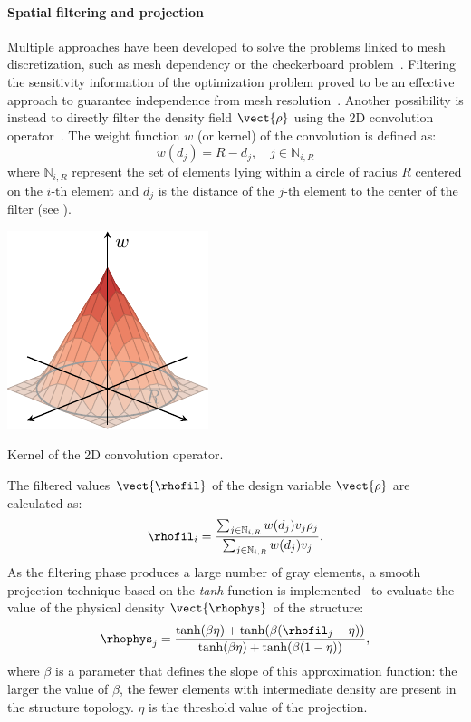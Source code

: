 \paragraph{Spatial filtering and projection} 
Multiple approaches have been developed to solve the problems linked to mesh discretization, such as mesh dependency or the checkerboard problem~. Filtering the sensitivity information of the optimization problem proved to be an effective approach to guarantee independence from mesh resolution~. Another possibility is instead to directly filter the density field $\vect{\rho}$ using the 2D convolution operator~. The weight function $w$ (or kernel) of the convolution is defined as:
\begin{equation}
    w(d_j) = R - d_j, \quad j \in \mathbb{N}_{i,R}
\end{equation} 
where $\mathbb{N}_{i,R}$ represent the set of elements lying within a circle of radius $R$ centered on the $i$-th element and $d_j$ is the distance of the $j$-th element to the center of the filter (see ).
\begin{marginfigure}
    \centering
    \includegraphics{figures/02_literature/02_circ_filter/filt_cir.pdf}
    \caption{Kernel of the 2D convolution operator.}
    \label{fig:02_ker}
\end{marginfigure} 
The filtered values $\vect{\rhofil}$ of the design variable $\vect{\rho}$  are calculated as:
\begin{equation}
    \rhofil_i = \frac{\sum_{j \in \mathbb{N}_{i,R}} w(d_j)v_j\rho_j}{\sum_{j \in \mathbb{N}_{i,R}} w(d_j)v_j}.
    \label{eq:02_rhofil}
\end{equation}
As the filtering phase produces a large number of gray elements, a smooth projection technique based on the \textit{tanh} function is implemented~ to evaluate the value of the physical density $\vect{\rhophys}$  of the structure:
\begin{equation}
    \rhophys_j = \frac{\tanh(\beta\eta)+\tanh(\beta(\rhofil_j - \eta))}{\tanh(\beta\eta)+\tanh(\beta(1 - \eta))},
    \label{eq:02_proj}
\end{equation}
where $\beta$ is a parameter that defines the slope of this approximation function: the larger the value of $\beta$, the fewer elements with intermediate density are present in the structure topology. $\eta$ is the threshold value of the projection.

